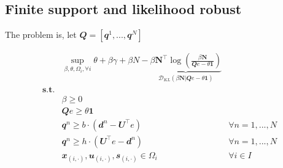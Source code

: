 \documentclass[
  a4paper,
,tablecaptionabove
]{scrartcl}
\numberwithin{equation}{section}
\begin{document}
\hypertarget{sec:finite-support-and-likelihood-robust}{%
  \subsection{Finite support and likelihood
    robust}\label{finite-support-and-likelihood-robust}}

The problem is, let
\(\mathbfit Q = [\mathbfit{q}^1, ..., \mathbfit{q}^N]\)

\[\begin{aligned}
     & \sup_{\beta, \theta, \Omega_i, \forall i} \theta + \beta \gamma +  \beta N - \underbrace{\beta \mathbf N^\top \log(\frac{\beta \mathbf N}{\mathbfit{Q} e-\theta \mathbf 1})}_{\mathcal D_{KL}(\beta \mathbf N | \mathbfit{Q} e-\theta \mathbf 1)}                         \\
    \textbf {s.t.}                                                                                                                                                                                                                                                               \\
     & \beta \ge 0                                                                                                                                                                                                                                                               \\
     & \mathbfit{Q} e \ge \theta \mathbf 1                                                                                                                                                                                                                                       \\
     & \mathbfit q^n \ge b\cdot \left (\mathbfit d^n - \mathbfit{U}^\top e \right)                                                                                                                                                                       & \forall n = 1, ..., N \\
     & \mathbfit q^n \ge h\cdot \left ( \mathbfit{U}^\top e  -\mathbfit d^n  \right )                                                                                                                                                                    & \forall n = 1, ..., N \\
     & \mathbfit x_{(i,\cdot)}, \mathbfit u_{(i,\cdot)}, \mathbfit s_{(i,\cdot)} \in \Omega_i                                                                                                                                                            & \forall i\in I
  \end{aligned}\]
\end{document}

